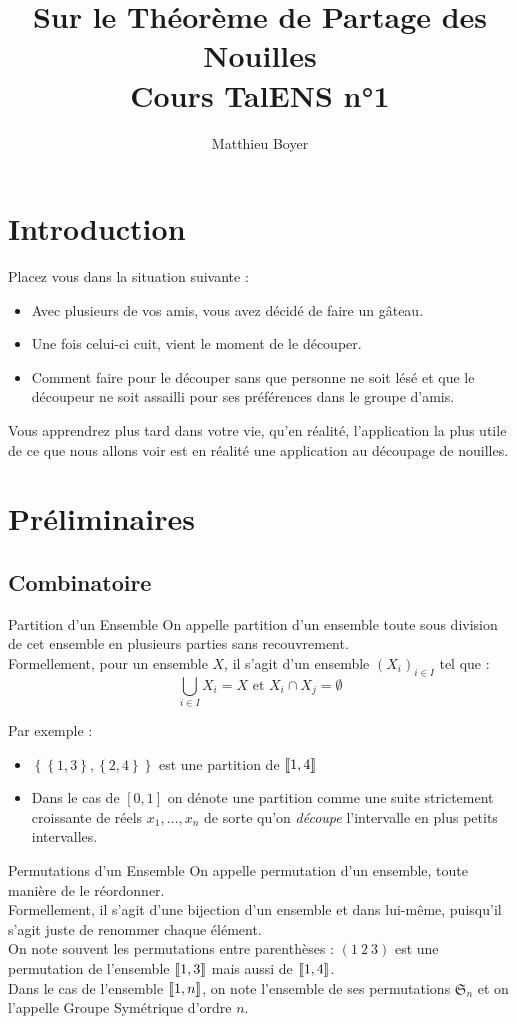 \documentclass{cours}
\title{Sur le Théorème de Partage des Nouilles\\ \small Cours TalENS n°1}
\author{Matthieu Boyer}
\date{}
\begin{document}
\section*{Introduction}
Placez vous dans la situation suivante :
\begin{itemize}
    \item Avec plusieurs de vos amis, vous avez décidé de faire un gâteau.
    \item Une fois celui-ci cuit, vient le moment de le découper.
    \item Comment faire pour le découper sans que personne ne soit lésé et que le découpeur ne soit assailli pour ses préférences dans le groupe d'amis.
\end{itemize}
Vous apprendrez plus tard dans votre vie, qu'en réalité, l'application la plus utile de ce que nous allons voir est en réalité une application au découpage de nouilles.

\section{Préliminaires}
\subsection{Combinatoire}
\begin{définition}{Partition d'un Ensemble}{}
On appelle partition d'un ensemble toute sous division de cet ensemble en plusieurs parties sans recouvrement.\\
Formellement, pour un ensemble $X$, il s'agit d'un ensemble $(X_{i})_{i\in I}$ tel que :
\[
    \bigcup_{i\in I}X_{i} = X \text{ et } X_{i} \cap X_{j} = \emptyset
\]
\end{définition}

Par exemple :
\begin{itemize}
    \item $\left\{\left\{1, 3\right\}, \left\{2, 4\right\}\right\}$ est une partition de $\left\llbracket 1, 4\right\rrbracket$
    \item Dans le cas de $\left[0, 1\right]$ on dénote une partition comme une suite strictement croissante de réels $x_{1}, \ldots, x_{n}$ de sorte qu'on \textit{découpe} l'intervalle en plus petits intervalles.
\end{itemize}

\begin{définition}{Permutations d'un Ensemble}{}
On appelle permutation d'un ensemble, toute manière de le réordonner.\\
Formellement, il s'agit d'une bijection d'un ensemble et dans lui-même, puisqu'il s'agit juste de renommer chaque élément.\\
On note souvent les permutations entre parenthèses : $\left(1 \ 2 \ 3\right)$ est une permutation de l'ensemble $\left\llbracket 1, 3\right\rrbracket$ mais aussi de $\left\llbracket 1, 4\right\rrbracket$.\\
Dans le cas de l'ensemble $\left\llbracket 1, n\right\rrbracket$, on note l'ensemble de ses permutations $\mathfrak{S}_{n}$ et on l'appelle Groupe Symétrique d'ordre $n$.
\end{définition}
\end{document}
